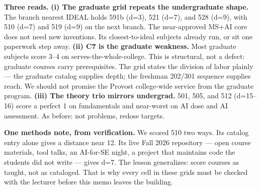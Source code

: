 \documentclass[10pt]{article}
\newcommand{\se}[1]{\textcolor{sered}{#1}}
\begin{document}
\textbf{Three reads.} \textbf{(i) The graduate grid repeats the undergraduate shape.} The branch nearest IDEAL holds \se{591b} (d=3), \se{521} (d=7), and 528 (d=9), with \se{510} (d=7) and \se{519} (d=9) on the next branch. The near-approved MS+AI core does not need new inventions. Its closest-to-ideal subjects already run, or sit one paperwork step away. \textbf{(ii) C7 is the graduate weakness.} Most graduate subjects score 3--4 on serves-the-whole-college. This is structural, not a defect: graduate courses carry prerequisites. The grid states the division of labor plainly --- the graduate catalog supplies depth; the freshman 202/301 sequence supplies reach. We should not promise the Provost college-wide service from the graduate program. \textbf{(iii) The theory trio mirrors undergrad.} 501, 505, and 512 (d=15--16) score a perfect 1 on fundamentals and near-worst on AI dose and AI assessment. As before: not problems, redose targets.

\textbf{One methods note, from verification.} We scored \se{510} two ways. Its catalog entry alone gives a distance near 12. Its live Fall 2026 repository --- open course materials, tool talks, an AI-for-SE night, a project that maintains code the students did not write --- gives d=7. The lesson generalizes: score courses as taught, not as cataloged. That is why every cell in these grids must be checked with the lecturer before this memo leaves the building.
\end{document}
